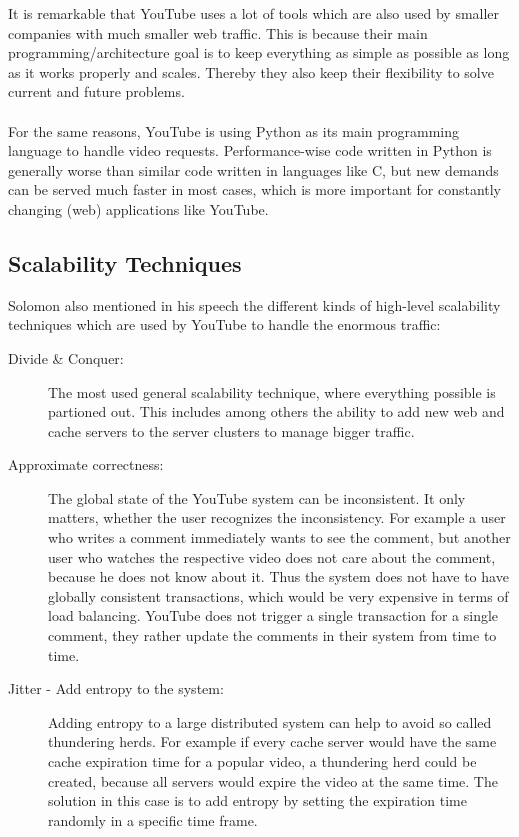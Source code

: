 It is remarkable that YouTube uses a lot of tools which are also used by smaller companies with much smaller web traffic. This is because their main programming/architecture goal is to keep everything as simple as possible as long as it works properly and scales. Thereby they also keep their flexibility to solve current and future problems.\\
\\
For the same reasons, YouTube is using Python as its main programming language to handle video requests. Performance-wise code written in Python is generally worse than similar code written in languages like C, but new demands can be served much faster in most cases, which is more important for constantly changing (web) applications like YouTube.

\subsection{Scalability Techniques}

Solomon also mentioned in his speech the different kinds of high-level scalability techniques which are used by YouTube to handle the enormous traffic:

\begin{description}
  \item[Divide \& Conquer:] The most used general scalability technique, where everything possible is partioned out. This includes among others the ability to add new web and cache servers to the server clusters to manage bigger traffic.

  \item[Approximate correctness:] The global state of the YouTube system can be inconsistent. It only matters, whether the user recognizes the inconsistency. For example a user who writes a comment immediately wants to see the comment, but another user who watches the respective video does not care about the comment, because he does not know about it. Thus the system does not have to have globally consistent transactions, which would be very expensive in terms of load balancing. YouTube does not trigger a single transaction for a single comment, they rather update the comments in their system from time to time.

  \item[Jitter - Add entropy to the system:] Adding entropy to a large dis\-tri\-bu\-ted system can help to avoid so called thundering herds. For example if every cache server would have the same cache expiration time for a popular video, a thundering herd could be created, because all servers would expire the video at the same time. The solution in this case is to add entropy by setting the expiration time randomly in a specific time frame.
\end{description}

